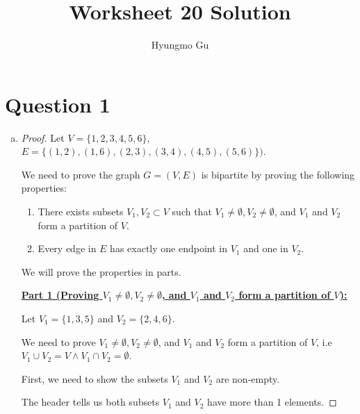 \documentclass[12pt]{article}
\begin{document}
\title{Worksheet 20 Solution}
\author{Hyungmo Gu}
\maketitle

\section*{Question 1}
\begin{enumerate}[a.]
    \item

    \bigskip

    \begin{proof}

    Let $V = \{1,2,3,4,5,6\}$, $E = \{(1,2),(1,6),(2,3),(3,4),(4,5),(5,6)\})$.

    \bigskip

    We need to prove the graph $G = (V,E)$ is bipartite by proving the following
    properties:

    \begin{enumerate}[1.]
        \item There exists subsets $V_1, V_2 \subset V$ such that
        $V_1 \neq \emptyset, V_2 \neq \emptyset$, and $V_1$ and $V_2$ form
        a partition of $V$.
        \item Every edge in $E$ has exactly one endpoint in $V_1$ and one in $V_2$.
    \end{enumerate}

    \bigskip

    We will prove the properties in parts.

    \bigskip

    \ul{\textbf{Part 1 (Proving $V_1 \neq \emptyset, V_2 \neq \emptyset$,
    and $V_1$ and $V_2$ form a partition of $V$):}}

    \bigskip

    Let $V_1 = \{1,3,5\}$ and $V_2 = \{2,4,6\}$.

    \bigskip

    We need to prove $V_1 \neq \emptyset, V_2 \neq \emptyset$, and
    $V_1$ and $V_2$ form a partition of $V$, i.e $V_1 \cup V_2 = V
    \land V_1 \cap V_2 = \emptyset$.

    \bigskip

    First, we need to show the subsets $V_1$ and $V_2$ are non-empty.

    \bigskip

    The header tells us both subsets $V_1$ and $V_2$ have more than
    1 elements.


\end{proof}
\end{enumerate}
\end{document}
